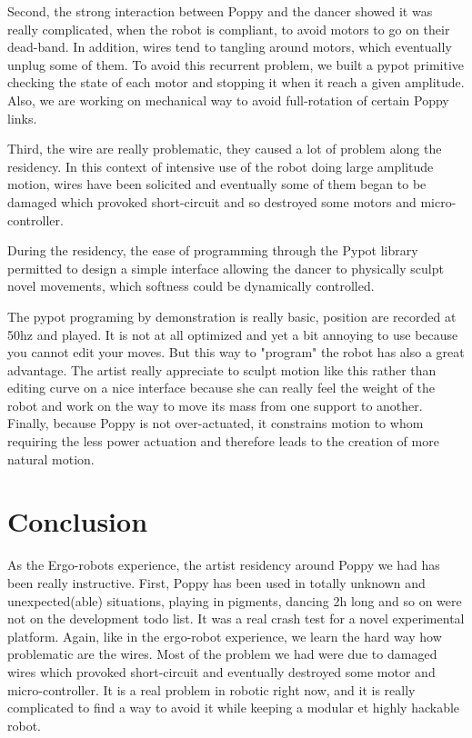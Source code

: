 \begin{figure}[]
\centering
    \hfil
    \caption{}
    \label{fig:broken_poppy_residency}
\end{figure}

Second, the strong interaction between Poppy and the dancer showed it was really complicated, when the robot is compliant, to avoid motors to go on their dead-band. In addition, wires tend to tangling around motors, which eventually unplug some of them. To avoid this recurrent problem, we built a pypot primitive checking the state of each motor and stopping it when it reach a given amplitude. Also, we are working on mechanical way to avoid full-rotation of certain Poppy links.

Third, the wire are really problematic, they caused a lot of problem along the residency. In this context of intensive use of the robot doing large amplitude motion, wires have been solicited and eventually some of them began to be damaged which provoked short-circuit and so destroyed some motors and micro-controller.

During the residency, the ease of programming through the Pypot library permitted to design a simple interface allowing the dancer to physically sculpt novel movements, which softness could be dynamically controlled.

The pypot programing by demonstration is really basic, position are recorded at 50hz and played. It is not at all optimized and yet a bit annoying to use because you cannot edit your moves. But this way to "program" the robot has also a great advantage. The artist really appreciate to sculpt motion like this rather than editing curve on a nice interface because she can really feel the weight of the robot and work on the way to move its mass from one support to another. Finally, because Poppy is not over-actuated, it constrains motion to whom requiring the less power actuation and therefore leads to the creation of more natural motion.


\section{Conclusion} %
As the Ergo-robots experience, the artist residency around Poppy we had has been really instructive. First, Poppy has been used in totally unknown and unexpected(able) situations, playing in pigments, dancing 2h long and so on were not on the development todo list. It was a real crash test for a novel experimental platform. Again, like in the ergo-robot experience, we learn the hard way how problematic are the wires. Most of the problem we had were due to damaged wires which provoked short-circuit and eventually destroyed some motor and micro-controller. It is a real problem in robotic right now, and it is really complicated to find a way to avoid it while keeping a modular et highly hackable robot.

